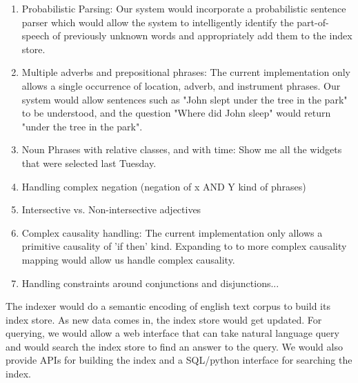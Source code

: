 \documentclass[10pt]{article}
\begin{document}
\begin{enumerate}
\item{
Probabilistic Parsing: Our system would incorporate a probabilistic sentence parser which would allow the system to intelligently identify the part-of-speech of previously unknown words and appropriately add them to the index store.
}

\item{
Multiple adverbs and prepositional phrases: The current implementation only allows a single occurrence of location, adverb, and instrument phrases. Our system would allow sentences such as "John slept under the tree in the park" to be understood, and the question "Where did John sleep" would return "under the tree in the park".
}

\item{
Noun Phrases with relative classes, and with time:  Show me all the widgets that were selected last Tuesday.
}

\item{
Handling complex negation (negation of x AND Y kind of phrases)
}

\item{
Intersective vs. Non-intersective adjectives
}

\item{
Complex causality handling: The current implementation only allows a primitive causality of 'if then' kind. Expanding to to more complex causality mapping would allow us handle complex causality.
}

\item{
Handling constraints around conjunctions and disjunctions...
}

\end{enumerate}
The indexer would do a semantic encoding of english text corpus to build its index store. As new data comes in, the index store would get updated. For querying, we would allow a web interface that can take natural language query and would search the index store to find an answer to the query. We would also provide APIs for building the index and a SQL/python interface for searching the index. 

 
\end{document}
